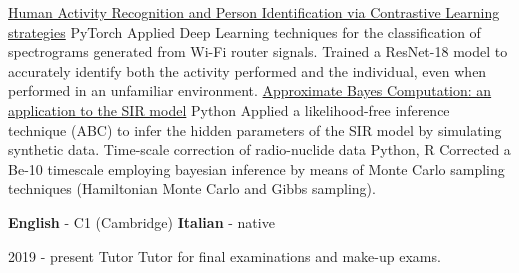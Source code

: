 \documentclass[9pt]{developercv} %
\begin{document}

\begin{entrylist}
    \entry
        {}
        {\href{https://github.com/giovanni-merlin/NNDL-HAR-project}{Human Activity Recognition and Person Identification via Contrastive Learning strategies}}
        {PyTorch}
		{Applied Deep Learning techniques for the classification of spectrograms generated from Wi-Fi router signals. Trained a ResNet-18 model to accurately identify both the activity performed and the individual, even when performed in an unfamiliar environment.}
    \entry
        {}
        {\href{https://github.com/diegobonato/approximate-bayes-sir}{Approximate Bayes Computation: an application to the SIR model}}
        {Python}
		{Applied a likelihood-free inference technique (ABC) to infer the hidden parameters of the SIR model by simulating synthetic data.}
    \entry
        {}
        {Time-scale correction of radio-nuclide data}
        {Python, R}
		{Corrected a Be-10 timescale employing bayesian inference by means of Monte Carlo sampling techniques (Hamiltonian Monte Carlo and Gibbs sampling).}


\end{entrylist}


\vspace{-10 pt}
    \vspace{-6pt}
    
    \hspace{26mm} \textbf{English} - C1 (Cambridge) \; \textbf{ Italian} - native

\vspace{-10 pt}
\begin{entrylist}

	\entry
	{2019 - present}
	{Tutor}
	{}
	{Tutor for final examinations and make-up exams.}

\end{entrylist}
\end{document}
